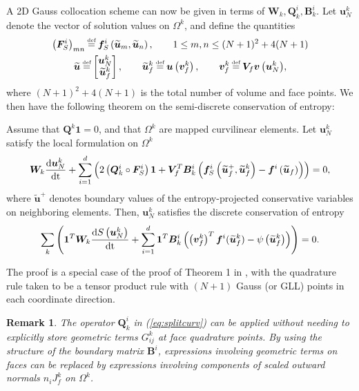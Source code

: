\documentclass[onefignum,onetabnum,final]{siamart171218}
\newtheorem*{remark}{Remark}
\renewcommand{\tilde}{\widetilde}
\newcommand{\td}[2]{\frac{{\rm d}#1}{{\rm d}{\rm #2}}}
\newcommand{\LRp}[1]{\left( #1 \right)}
\newcommand\myeq{\mathrel{\stackrel{\makebox[0pt]{\mbox{\normalfont\tiny def}}}{=}}}
\begin{document}
A 2D Gauss collocation scheme can now be given in terms of $\bm{W}_k, \bm{Q}^i_k, \bm{B}^i_k$.   Let $\bm{u}^k_N$ denote the vector of solution values on $\Omega^k$, and define the quantities 
\begin{gather*}
\LRp{\bm{F}^i_S}_{mn} \myeq \bm{f}^i_S\LRp{\tilde{\bm{u}}_m,\tilde{\bm{u}}_n}, \qquad 1 \leq m,n \leq (N+1)^2 + 4(N+1) \\
\tilde{\bm{u}} \myeq \begin{bmatrix}
\bm{u}^k_N\\
\tilde{\bm{u}}^k_f
\end{bmatrix}, \qquad \tilde{\bm{u}}^k_f \myeq \bm{u}\LRp{\bm{v}^k_f}, \qquad 
\bm{v}^k_f \myeq {\bm{V}_f\bm{v}\LRp{\bm{u}^k_N}},
\end{gather*}
where $(N+1)^2 + 4(N+1)$ is the total number of volume and face points.  
We then have the following theorem on the semi-discrete conservation of entropy:
\begin{theorem}
\label{thm:esdg2d}
Assume that $\bm{Q}^k\bm{1} = 0$, and that $\Omega^k$ are mapped curvilinear elements.  Let $\bm{u}^k_N$ satisfy the local formulation on $\Omega^k$
\begin{equation}
{\bm{W}_k\td{\bm{u}^k_N}{t} + \sum_{i=1}^d \LRp{2\LRp{\bm{Q}^i_k\circ\bm{F}^i_S}\bm{1} + \bm{V}_f^T\bm{B}_k^i\LRp{\bm{f}^i_S\LRp{{\tilde{\bm{u}}_f}^+,\tilde{\bm{u}}^k_f}-\bm{f}^i\LRp{\tilde{\bm{u}}_f}}}} = 0, 
\end{equation}
where $\tilde{\bm{u}}^+$ denotes boundary values of the entropy-projected conservative variables on neighboring elements.  Then, $\bm{u}^k_N$ satisfies the discrete conservation of entropy 
\[
\sum_{k} \LRp{\bm{1}^T\bm{W}_k\td{S\LRp{\bm{u}^k_N}}{t} + \sum_{i=1}^d\bm{1}^T\bm{B}^i_k\LRp{\LRp{\bm{v}^k_f}^T\bm{f}^i(\tilde{\bm{u}}^k_f) - \psi\LRp{\tilde{\bm{u}}^k_f}}} = 0.
\]
\end{theorem}
The proof is a special case of the proof of Theorem 1 in \cite{chan2018discretely}, with the quadrature rule taken to be a tensor product rule with $(N+1)$ Gauss (or GLL) points in each coordinate direction.  

\begin{remark}
The operator $\bm{Q}^i_k$  in (\ref{eq:splitcurv}) can be applied without needing to explicitly store geometric terms $G^k_{ij}$ at face quadrature points.  By using the structure of the boundary matrix $\bm{B}^i$, expressions involving geometric terms on faces can be replaced by expressions involving components of scaled outward normals ${n}_i J^k_f$ on $\Omega^k$.  
\end{remark}
\end{document}
